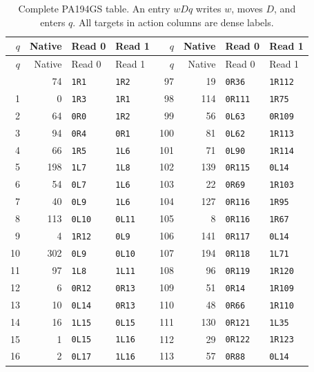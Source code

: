 \begingroup\small\setlength{\tabcolsep}{7pt}
\begin{longtable}{rrll@{\qquad}rrll}
\caption{Complete PA194GS table. An entry $wDq$ writes $w$, moves $D$, and enters $q$. All targets in action columns are dense labels.}\label{tab:machine}\\
\toprule $q$ & Native & Read 0 & Read 1 & $q$ & Native & Read 0 & Read 1\\\midrule\endfirsthead
\toprule $q$ & Native & Read 0 & Read 1 & $q$ & Native & Read 0 & Read 1\\\midrule\endhead
\bottomrule\endfoot
0 & 74 & \texttt{1R1} & \texttt{1R2} & 97 & 19 & \texttt{0R36} & \texttt{1R112}\\
1 & 0 & \texttt{1R3} & \texttt{1R1} & 98 & 114 & \texttt{0R111} & \texttt{1R75}\\
2 & 64 & \texttt{0R0} & \texttt{1R2} & 99 & 56 & \texttt{0L63} & \texttt{0R109}\\
3 & 94 & \texttt{0R4} & \texttt{0R1} & 100 & 81 & \texttt{0L62} & \texttt{1R113}\\
4 & 66 & \texttt{1R5} & \texttt{1L6} & 101 & 71 & \texttt{0L90} & \texttt{1R114}\\
5 & 198 & \texttt{1L7} & \texttt{1L8} & 102 & 139 & \texttt{0R115} & \texttt{0L14}\\
6 & 54 & \texttt{0L7} & \texttt{1L6} & 103 & 22 & \texttt{0R69} & \texttt{1R103}\\
7 & 40 & \texttt{0L9} & \texttt{1L6} & 104 & 127 & \texttt{0R116} & \texttt{1R95}\\
8 & 113 & \texttt{0L10} & \texttt{0L11} & 105 & 8 & \texttt{0R116} & \texttt{1R67}\\
9 & 4 & \texttt{1R12} & \texttt{0L9} & 106 & 141 & \texttt{0R117} & \texttt{0L14}\\
10 & 302 & \texttt{0L9} & \texttt{0L10} & 107 & 194 & \texttt{0R118} & \texttt{1L71}\\
11 & 97 & \texttt{1L8} & \texttt{1L11} & 108 & 96 & \texttt{0R119} & \texttt{1R120}\\
12 & 6 & \texttt{0R12} & \texttt{0R13} & 109 & 51 & \texttt{0R14} & \texttt{1R109}\\
13 & 10 & \texttt{0L14} & \texttt{0R13} & 110 & 48 & \texttt{0R66} & \texttt{1R110}\\
14 & 16 & \texttt{1L15} & \texttt{0L15} & 111 & 130 & \texttt{0R121} & \texttt{1L35}\\
15 & 1 & \texttt{0L15} & \texttt{1L16} & 112 & 29 & \texttt{0R122} & \texttt{1R123}\\
16 & 2 & \texttt{0L17} & \texttt{1L16} & 113 & 57 & \texttt{0R88} & \texttt{0L14}\\

\end{longtable}
